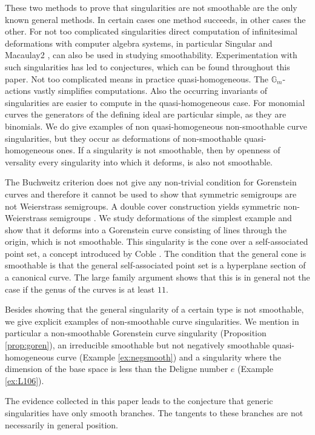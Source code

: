 \documentclass{amsart}
\theoremstyle{definition}
\theoremstyle{remark}
\begin{document}
These two methods  to prove that singularities are not smoothable
are the only known general methods. In certain cases one method succeeds, in other
cases the other. For not too complicated singularities direct computation of infinitesimal
deformations with computer algebra systems, in particular Singular \cite{Sing} and Macaulay2 \cite{M2},
can also be used in studying smoothability. Experimentation  with such singularities has led to conjectures, which can be found throughout this paper. Not too complicated means in
practice quasi-homogeneous. The $\mathbb G_m$-actions vastly simplifies computations.
Also the occurring invariants of singularities are easier to compute in the quasi-homogeneous
case. For monomial curves the generators of the defining ideal are particular simple, as they 
are binomials.  We do give examples of non quasi-homogeneous non-smoothable curve
singularities, but they occur as deformations of non-smoothable quasi-homogeneous ones.
If a singularity is not smoothable, then by openness of versality every singularity into which
it deforms, is also not smoothable. 

The Buchweitz criterion does not give any non-trivial condition for Gorenstein curves and therefore it cannot be used 
to show that symmetric semigroups are not Weierstrass semigroups. A double cover
construction   yields symmetric non-Weierstrass semigroups \cite{To}. We study
deformations of the simplest example and show that it deforms into a Gorenstein curve
consisting of lines through the origin, which is not smoothable. This singularity is the cone
over a self-associated point set, a concept introduced by Coble \cite{Co}.
The condition that the general cone is smoothable is that the general self-associated point set is
a hyperplane section of a canonical curve.   
The large family argument shows that this is
in general not the case if the genus of the curves is at least $11$.

Besides showing that the general singularity of a certain type is not smoothable, we
give explicit examples of non-smoothable curve singularities. We mention in particular
a non-smoothable Gorenstein curve singularity (Proposition \ref{prop:goren}),
an irreducible smoothable but not negatively smoothable quasi-homogeneous curve 
(Example \ref{ex:negsmooth})
and a singularity where the dimension of the base space is less than the Deligne number $e$
(Example \ref{ex:L106}).

The evidence collected in this paper leads to the conjecture that
generic singularities have only smooth branches. The tangents to these branches are not necessarily
in general position.
\end{document}
